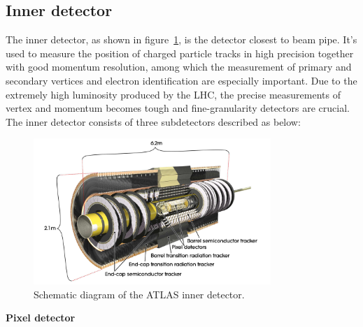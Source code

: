\subsection{Inner detector}

The inner detector, as shown in figure~\ref{fig:inner_dec}, is the detector closest to beam pipe.
It's used to measure the position of charged particle tracks in high precision together with good momentum resolution,
among which the measurement of primary and secondary vertices and electron identification are especially important.
Due to the extremely high luminosity produced by the LHC, the precise measurements of vertex and momentum becomes tough and fine-granularity detectors are crucial.
The inner detector consists of three subdetectors described as below:
\begin{figure}[!htb]
  \centering
  \includegraphics[width=0.8\textwidth]{figures/Detector/ID_newTRT_d3.png}
  \caption{Schematic diagram of the ATLAS inner detector\cite{Aad:1698966}.}
  \label{fig:inner_dec}
\end{figure}

\textbf{Pixel detector}

